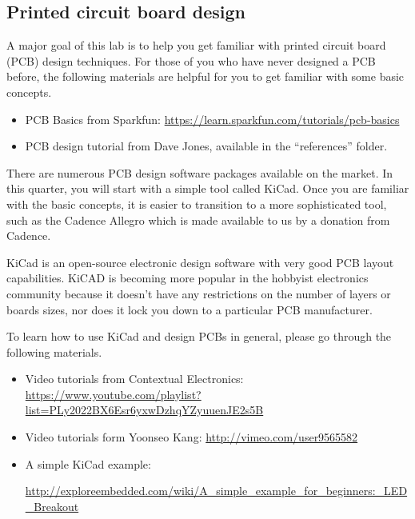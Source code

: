 \documentclass[letterpaper, 11pt]{article}
\begin{document}
\subsection{Printed circuit board design}
A major goal of this lab is to help you get familiar with printed circuit board (PCB) design techniques. For those of you who have never designed a PCB before, the following materials are helpful for you to get familiar with some basic concepts. 

\begin{itemize}[itemsep=0.1ex]

	\item PCB Basics from Sparkfun:	 \url{https://learn.sparkfun.com/tutorials/pcb-basics} 
	
	\item PCB design tutorial from Dave Jones, available in the ``references'' folder.
		
\end{itemize}

There are numerous PCB design software packages available on the market. In this quarter, you will start with a simple tool called KiCad. Once you are familiar with the basic concepts, it is easier to transition to a more sophisticated tool, such as the Cadence Allegro which is made available to us by a donation from Cadence. 

KiCad is an open-source electronic design software with very good PCB layout capabilities. KiCAD is becoming more popular in the hobbyist electronics community because it doesn't have any restrictions on the number of layers or boards sizes, nor does it lock you down to a particular PCB manufacturer.

To learn how to use KiCad and design PCBs in general, please go through the following materials.

\begin{itemize}[itemsep=0.1ex]

	\item Video tutorials from Contextual Electronics:	 \url{https://www.youtube.com/playlist?list=PLy2022BX6Esr6yxwDzhqYZyuuenJE2s5B} 
	
	\item 	Video tutorials form  Yoonseo Kang:	 \url{http://vimeo.com/user9565582} 

	\item A simple KiCad example: 
	
	\url{http://exploreembedded.com/wiki/A_simple_example_for_beginners:_LED_Breakout} 
		
\end{itemize}
\end{document}
